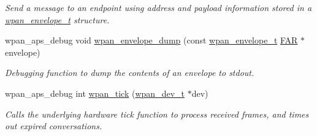 \begin{DoxyCompactItemize}
\begin{DoxyCompactList}\small\item\em Send a message to an endpoint using address and payload information stored in a \hyperlink{structwpan__envelope__t}{wpan\-\_\-envelope\-\_\-t} structure. \end{DoxyCompactList}\item 
wpan\-\_\-aps\-\_\-debug void \hyperlink{group__wpan__aps_ga2a4e8b3e2022e55e6607243a5feb25cd}{wpan\-\_\-envelope\-\_\-dump} (const \hyperlink{structwpan__envelope__t}{wpan\-\_\-envelope\-\_\-t} \hyperlink{group__hal_gaef060b3456fdcc093a7210a762d5f2ed}{F\-A\-R} $\ast$envelope)
\begin{DoxyCompactList}\small\item\em Debugging function to dump the contents of an envelope to stdout. \end{DoxyCompactList}\item 
wpan\-\_\-aps\-\_\-debug int \hyperlink{group__wpan__aps_ga1254464011d2d98c13db7b0b3d41c25b}{wpan\-\_\-tick} (\hyperlink{structwpan__dev__t}{wpan\-\_\-dev\-\_\-t} $\ast$dev)
\begin{DoxyCompactList}\small\item\em Calls the underlying hardware tick function to process received frames, and times out expired conversations. \end{DoxyCompactList}\end{DoxyCompactItemize}
